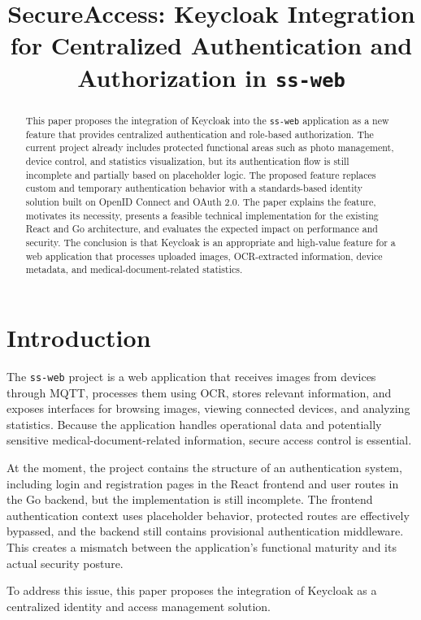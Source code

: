 \documentclass[conference]{IEEEtran}
\title{SecureAccess: Keycloak Integration for Centralized Authentication and Authorization in \texttt{ss-web}}
\author{
\IEEEauthorblockN{Student Team}
\IEEEauthorblockA{
Master Program Project \\
Systems Security \\
Replace with student names and institutional e-mail addresses
}
}
\begin{document}
\maketitle

\begin{abstract}
This paper proposes the integration of Keycloak into the \texttt{ss-web} application as a new feature that provides centralized authentication and role-based authorization. The current project already includes protected functional areas such as photo management, device control, and statistics visualization, but its authentication flow is still incomplete and partially based on placeholder logic. The proposed feature replaces custom and temporary authentication behavior with a standards-based identity solution built on OpenID Connect and OAuth 2.0. The paper explains the feature, motivates its necessity, presents a feasible technical implementation for the existing React and Go architecture, and evaluates the expected impact on performance and security. The conclusion is that Keycloak is an appropriate and high-value feature for a web application that processes uploaded images, OCR-extracted information, device metadata, and medical-document-related statistics.
\end{abstract}

\section{Introduction}

The \texttt{ss-web} project is a web application that receives images from devices through MQTT, processes them using OCR, stores relevant information, and exposes interfaces for browsing images, viewing connected devices, and analyzing statistics. Because the application handles operational data and potentially sensitive medical-document-related information, secure access control is essential.

At the moment, the project contains the structure of an authentication system, including login and registration pages in the React frontend and user routes in the Go backend, but the implementation is still incomplete. The frontend authentication context uses placeholder behavior, protected routes are effectively bypassed, and the backend still contains provisional authentication middleware. This creates a mismatch between the application's functional maturity and its actual security posture.

To address this issue, this paper proposes the integration of Keycloak as a centralized identity and access management solution.
\end{document}
